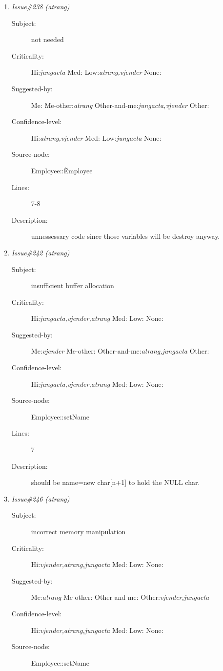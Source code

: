 \begin{enumerate}
\begin{description}
\item [Lines:] 5

\item [Description:] should be socSecurity = 0;
\end{description}
\item {\it Issue\#238 (atrang)}
\begin{description}
\item [Subject:] not needed
\item [Criticality:] Hi:{\it jungacta} Med:{\it } Low:{\it atrang,vjender} None:{\it }
\item [Suggested-by:] Me:{\it } Me-other:{\it atrang} Other-and-me:{\it jungacta,vjender} Other:{\it }
\item [Confidence-level:] Hi:{\it atrang,vjender} Med:{\it } Low:{\it jungacta} None:{\it }
\item [Source-node:] Employee::\~Employee

\item [Lines:] 7-8

\item [Description:] unnessessary code since those variables will be destroy anyway.
\end{description}
\item {\it Issue\#242 (atrang)}
\begin{description}
\item [Subject:] insufficient buffer allocation
\item [Criticality:] Hi:{\it jungacta,vjender,atrang} Med:{\it } Low:{\it } None:{\it }
\item [Suggested-by:] Me:{\it vjender} Me-other:{\it } Other-and-me:{\it atrang,jungacta} Other:{\it }
\item [Confidence-level:] Hi:{\it jungacta,vjender,atrang} Med:{\it } Low:{\it } None:{\it }
\item [Source-node:] Employee::setName

\item [Lines:] 7

\item [Description:] should be name=new char[n+1] to hold the NULL char.
\end{description}
\item {\it Issue\#246 (atrang)}
\begin{description}
\item [Subject:] incorrect memory manipulation
\item [Criticality:] Hi:{\it vjender,atrang,jungacta} Med:{\it } Low:{\it } None:{\it }
\item [Suggested-by:] Me:{\it atrang} Me-other:{\it } Other-and-me:{\it } Other:{\it vjender,jungacta}
\item [Confidence-level:] Hi:{\it vjender,atrang,jungacta} Med:{\it } Low:{\it } None:{\it }
\item [Source-node:] Employee::setName


\end{description}
\end{enumerate}
